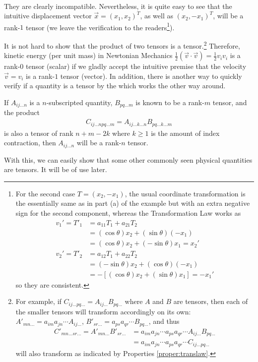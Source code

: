 \begin{solution}
\begin{align*}
\end{align*}
They are clearly incompatible. Nevertheless, it is quite easy to see that the intuitive displacement vector $\vec{x} = (x_1,x_2)^T$, as well as $(x_2,-x_1)^T$, will be a rank-$1$ tensor (we leave the verification to the readers\footnote{For the second case $T = (x_2, -x_1)$, the usual coordinate transformation is the essentially same as in part (a) of the example but with an extra negative sign for the second component, whereas the Transformation Law works as
\begin{align*}
v_1' = T'_1 &= a_{11}T_1 + a_{21}T_2 \\
&= (\cos \theta) x_2 + (\sin \theta) (-x_1) \\
&= (\cos \theta) x_2 + (-\sin \theta) x_1 = x_2' \\
v_2' = T'_2 &= a_{12}T_1 + a_{22}T_2 \\
&= (-\sin\theta) x_2 + (\cos\theta) (-x_1) \\
&= -[(\cos \theta) x_2 + (\sin\theta) x_1] = -x_1'
\end{align*} so they are consistent.}).
\end{solution}
It is not hard to show that the product of two tensors is a tensor.\footnote{For example, if $C_{ij\ldots pq\ldots} = A_{ij\ldots}B_{pq\ldots}$ where $A$ and $B$ are tensors, then each of the smaller tensors will transform accordingly on its own: $A'_{mn\ldots} = a_{im}a_{jn}\cdots A_{ij\ldots}$, $B'_{sr\ldots} = a_{ps}a_{qr}\cdots B_{pq\ldots}$, and thus
\begin{align*}
C'_{mn\ldots sr\ldots} = A'_{mn\ldots}B'_{sr\ldots} &= a_{im}a_{jn}\cdots a_{ps}a_{qr}\cdots A_{ij\ldots} B_{pq\ldots} \\
&= a_{im}a_{jn}\cdots a_{ps}a_{qr}\cdots C_{ij\ldots pq\ldots}
\end{align*} will also transform as indicated by Properties \ref{proper:translaw}.} Therefore, kinetic energy (per unit mass) in Newtonian Mechanics $\frac{1}{2}(\vec{v} \cdot \vec{v}) = \frac{1}{2}v_iv_i$ is a rank-$0$ tensor (scalar) if we gladly accept the intuitive premise that the velocity $\vec{v} = v_i$ is a rank-$1$ tensor (vector). In addition, there is another way to quickly verify if a quantity is a tensor by the  which works the other way around.
\begin{thm}
\label{thm:quotientl}
If $A_{ij\ldots n}$ is a $n$-subscripted quantity, $B_{pq\ldots m}$ is known to be a rank-$m$ tensor, and the product
\begin{align*}
C_{ij\ldots npq \ldots m} = A_{ij\ldots k\ldots n} B_{pq\ldots k\ldots m}   
\end{align*}
is also a tensor of rank $n+m-2k$ where $k \geq 1$ is the amount of index contraction, then $A_{ij\ldots n}$ will be a rank-$n$ tensor.
\end{thm}
With this, we can easily show that some other commonly seen physical quantities are tensors. It will be of use later. 

